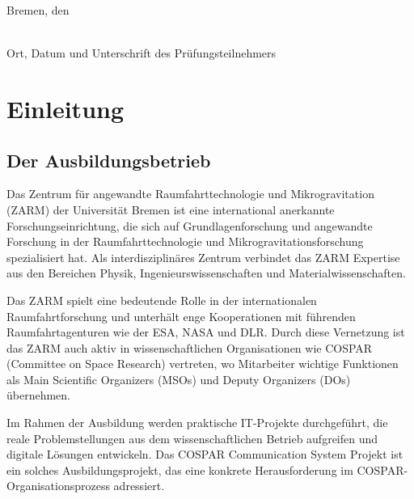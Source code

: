 \documentclass[11pt,a4paper]{article}
\begin{document}
\vspace{3cm}

\noindent
Bremen, den \underline{\hspace{3cm}}

\vspace{2cm}

\noindent
\underline{\hspace{8cm}}\\
Ort, Datum und Unterschrift des Prüfungsteilnehmers

\newpage

\setcounter{page}{1}
\tableofcontents
\newpage

\thispagestyle{empty}
\listoffigures


\clearpage
{}
\setcounter{page}{1}
\section{Einleitung}

\subsection{Der Ausbildungsbetrieb}
Das Zentrum für angewandte Raumfahrttechnologie und Mikrogravitation (ZARM) der Universität Bremen ist eine international anerkannte Forschungseinrichtung, die sich auf Grundlagenforschung und angewandte Forschung in der Raumfahrttechnologie und Mikrogravitationsforschung spezialisiert hat. Als interdisziplinäres Zentrum verbindet das ZARM Expertise aus den Bereichen Physik, Ingenieurswissenschaften und Materialwissenschaften.

Das ZARM spielt eine bedeutende Rolle in der internationalen Raumfahrtforschung und unterhält enge Kooperationen mit führenden Raumfahrtagenturen wie der ESA, NASA und DLR. Durch diese Vernetzung ist das ZARM auch aktiv in wissenschaftlichen Organisationen wie COSPAR (Committee on Space Research) vertreten, wo Mitarbeiter wichtige Funktionen als Main Scientific Organizers (MSOs) und Deputy Organizers (DOs) übernehmen.

Im Rahmen der Ausbildung werden praktische IT-Projekte durchgeführt, die reale Problemstellungen aus dem wissenschaftlichen Betrieb aufgreifen und digitale Lösungen entwickeln. Das COSPAR Communication System Projekt ist ein solches Ausbildungsprojekt, das eine konkrete Herausforderung im COSPAR-Organisationsprozess adressiert.
\end{document}
